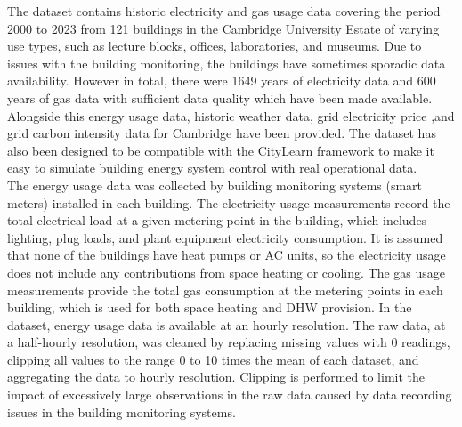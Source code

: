 \newpage
\noindent
The dataset contains historic electricity and gas usage data covering the period 2000 to 2023 from 121 buildings in the Cambridge University Estate of varying use types, such as lecture blocks, offices, laboratories, and museums. Due to issues with the building monitoring, the buildings have sometimes sporadic data availability. However in total, there were 1649 years of electricity data and 600 years of gas data with sufficient data quality which have been made available. Alongside this energy usage data, historic weather data, grid electricity price ,and grid carbon intensity data for Cambridge have been provided. The dataset has also been designed to be compatible with the CityLearn framework \citep{vazquez-canteli2019CityLearnV1OpenAI,vazquez-canteli2020CityLearnStandardizingResearch} to make it easy to simulate building energy system control with real operational data.\\

The energy usage data was collected by building monitoring systems (smart meters) installed in each building. The electricity usage measurements record the total electrical load at a given metering point in the building, which includes lighting, plug loads, and plant equipment  electricity consumption. It is assumed that none of the buildings have heat pumps or AC units, so the electricity usage does not include any contributions from space heating or cooling. The gas usage measurements provide the total gas consumption at the metering points in each building, which is used for both space heating and DHW provision. In the dataset, energy usage data is available at an hourly resolution. The raw data, at a half-hourly resolution, was cleaned by replacing missing values with 0 readings, clipping all values to the range 0 to 10 times the mean of each dataset, and aggregating the data to hourly resolution. Clipping is performed to limit the impact of excessively large observations in the raw data caused by data recording issues in the building monitoring systems.


